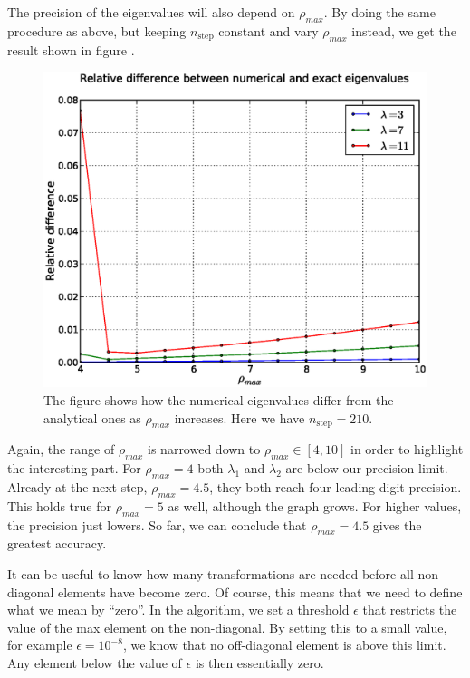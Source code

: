 The precision of the eigenvalues will also depend on $\rho_{max}$. By doing the same
procedure as above, but keeping $n_{\mathrm{step}}$ constant and vary $\rho_{max}$ instead, we
get the result shown in figure .
%
\begin{figure}[htpb]
	\centering
	\includegraphics[width=1.0\textwidth]{images/reldiff2.eps}
	\caption{The figure shows how the numerical eigenvalues differ from the analytical
		ones as $\rho_{max}$ increases. Here we have $n_{\mathrm{step}} = 210$.}
	\label{fig:rhoreldiff}
\end{figure}
%
Again, the range of $\rho_{max}$ is narrowed down to $\rho_{max} \in [4,10]$ in order to
highlight the interesting part. For $\rho_{max} = 4$ both $\lambda_1$ and $\lambda_2$ are
below our precision limit. Already at the next step, $\rho_{max} = 4.5$, they both
reach four leading digit precision. This holds true for $\rho_{max} = 5$ as well, although
the graph grows. For higher values, the precision just lowers.
So far, we can conclude that $\rho_{max} = 4.5$ gives the greatest accuracy.

It can be useful to know how many transformations are needed before all non-diagonal
elements have become zero. Of course, this means that we need to define what we mean by
``zero''. In the algorithm, we set a threshold $\epsilon$ that restricts the value of the
max element on the non-diagonal. By setting this to a small value, for example $\epsilon =
10^{-8}$, we know that no off-diagonal element is above this limit. Any element below the
value of $\epsilon$ is then essentially zero.

